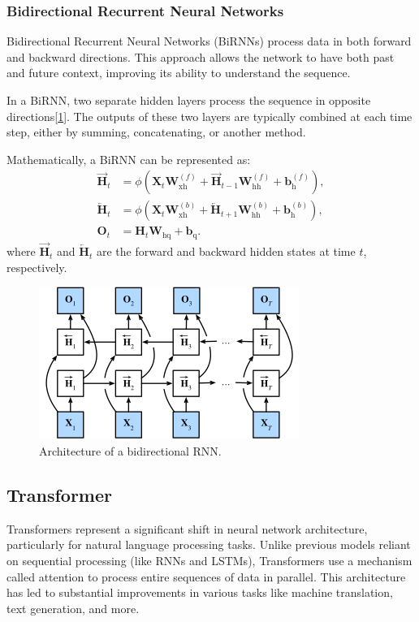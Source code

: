 \documentclass[10pt,twocolumn,letterpaper]{article}
\begin{document}
\subsubsection{Bidirectional Recurrent Neural Networks}
\label{sec:birnn}
Bidirectional Recurrent Neural Networks (BiRNNs) process data in both forward and backward directions. This approach allows the network to have both past and future context, improving its ability to understand the sequence\cite{schuster1997bidirectional}.

In a BiRNN, two separate hidden layers process the sequence in opposite directions[\ref{fig:brnn}]. The outputs of these two layers are typically combined at each time step, either by summing, concatenating, or another method.

Mathematically, a BiRNN can be represented as:
\begin{align*}
	\overrightarrow{\mathbf{H}}_t &= \phi(\mathbf{X}_t \mathbf{W}_{\textrm{xh}}^{(f)} + \overrightarrow{\mathbf{H}}_{t-1} \mathbf{W}_{\textrm{hh}}^{(f)}  + \mathbf{b}_\textrm{h}^{(f)}),\\
	\overleftarrow{\mathbf{H}}_t &= \phi(\mathbf{X}_t \mathbf{W}_{\textrm{xh}}^{(b)} + \overleftarrow{\mathbf{H}}_{t+1} \mathbf{W}_{\textrm{hh}}^{(b)}  + \mathbf{b}_\textrm{h}^{(b)}),\\
	\mathbf{O}_t &= \mathbf{H}_t \mathbf{W}_{\textrm{hq}} + \mathbf{b}_\textrm{q}.
\end{align*}
where \( \overrightarrow{\mathbf{H}}_t \) and \( \overleftarrow{\mathbf{H}}_t \) are the forward and backward hidden states at time \( t \), respectively.
\begin{figure}[h]
	\centering
	\includegraphics[width=0.7\columnwidth]{birnn}
	\caption{Architecture of a bidirectional RNN\cite{zhang2023dive}.}
	\label{fig:brnn}
\end{figure}
\subsection{Transformer}
\label{sec:transformer}
Transformers represent a significant shift in neural network architecture, particularly for natural language processing tasks.
Unlike previous models reliant on sequential processing (like RNNs and LSTMs), Transformers use a mechanism called attention to process entire sequences of data in parallel.
This architecture has led to substantial improvements in various tasks like machine translation, text generation, and more.
\end{document}
